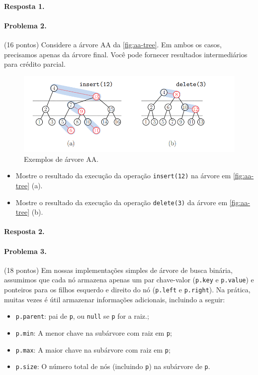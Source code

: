 \documentclass{article}
\begin{document}
\paragraph{Resposta 1.}

\paragraph{Problema 2.} (16 pontos)
Considere a árvore AA da \autoref{fig:aa-tree}. Em ambos os casos, precisamos apenas da árvore final. Você pode fornecer resultados intermediários para crédito parcial.

\begin{figure}[h]
    \centering
    \includegraphics[width = 0.7\linewidth]{figures/fig-2.png}
    \caption{Exemplos de árvore AA.}
    \label{fig:aa-tree}
\end{figure}

\begin{itemize}
    \item Mostre o resultado da execução da operação \texttt{insert(12)} na árvore em \autoref{fig:aa-tree} (a).
    \item Mostre o resultado da execução da operação \texttt{delete(3)} da árvore em \autoref{fig:aa-tree} (b).
\end{itemize}

\paragraph{Resposta 2.}

\paragraph{Problema 3.} (18 pontos)
Em nossas implementações simples de árvore de busca binária, assumimos que cada nó armazena
apenas um par chave-valor (\texttt{p.key} e \texttt{p.value}) e ponteiros para os filhos esquerdo e direito do nó
(\texttt{p.left} e \texttt{p.right}). Na prática, muitas vezes é útil armazenar informações adicionais, incluindo
a seguir:

\begin{itemize}
    \item \texttt{p.parent}: pai de \texttt{p}, ou \texttt{null} se \texttt{p} for a raiz.;
    \item \texttt{p.min}: A menor chave na subárvore com raiz em \texttt{p};
    \item \texttt{p.max}: A maior chave na subárvore com raiz em \texttt{p};
    \item \texttt{p.size}: O número total de nós (incluindo \texttt{p}) na subárvore de \texttt{p}.
\end{itemize}
\end{document}
